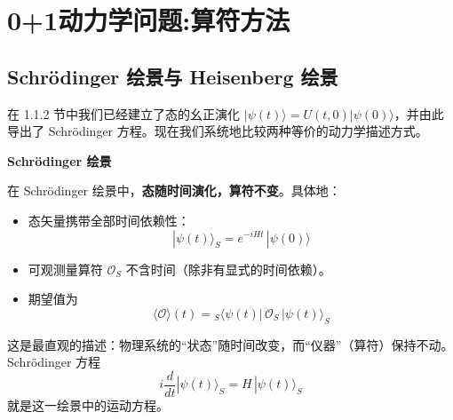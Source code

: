 \section{0+1动力学问题:算符方法}
\subsection{Schr\"{o}dinger 绘景与 Heisenberg 绘景}

在 1.1.2 节中我们已经建立了态的幺正演化 $|\psi(t)\rangle = U(t,0)|\psi(0)\rangle$，并由此导出了 Schr\"{o}dinger 方程。现在我们系统地比较两种等价的动力学描述方式。

\begin{center}\vspace{2ex}
\textbf{Schr\"{o}dinger 绘景}
\vspace{2ex}\end{center}

在 Schr\"{o}dinger 绘景中，\textbf{态随时间演化，算符不变}。具体地：
\begin{itemize}
\item 态矢量携带全部时间依赖性：
\begin{equation}
|\psi(t)\rangle_S = e^{-iHt}\,|\psi(0)\rangle
\end{equation}
\item 可观测量算符 $\mathcal{O}_S$ 不含时间（除非有显式的时间依赖）。
\item 期望值为
\begin{equation}
\langle \mathcal{O} \rangle(t)
= {}_S\langle\psi(t)|\,\mathcal{O}_S\,|\psi(t)\rangle_S
\end{equation}
\end{itemize}
这是最直观的描述：物理系统的``状态''随时间改变，而``仪器''（算符）保持不动。Schr\"{o}dinger 方程
\begin{equation}
i\frac{d}{dt}|\psi(t)\rangle_S = H\,|\psi(t)\rangle_S
\end{equation}
就是这一绘景中的运动方程。


